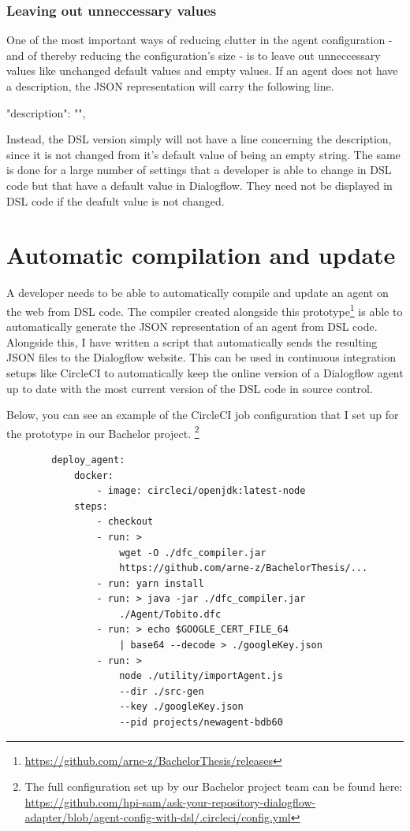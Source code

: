 \subsubsection{Leaving out unneccessary values}

One of the most important ways of reducing clutter in the agent configuration - and of thereby reducing the configuration's size - is to leave out unneccessary values like unchanged default values and empty values.
If an agent does not have a description, the JSON representation will carry the following line.
\begin{JSON}
    "description": "",
\end{JSON}
Instead, the DSL version simply will not have a line concerning the description, since it is not changed from it's default value of being an empty string.
The same is done for a large number of settings that a developer is able to change in DSL code but that have a default value in Dialogflow. They need not be displayed in DSL code if the deafult value is not changed.


\section{Automatic compilation and update}
A developer needs to be able to automatically compile and update an agent on the web from DSL code.
The compiler created alongside this prototype\footnote{\url{https://github.com/arne-z/BachelorThesis/releases}} is able to automatically generate the JSON representation of an agent from DSL code.
Alongside this, I have written a script that automatically sends the resulting JSON files to the Dialogflow website.
This can be used in continuous integration setups like CircleCI \cite{CircleCI} to automatically keep the online version of a Dialogflow agent up to date with the most current version of the DSL code in source control.

Below, you can see an example of the CircleCI job configuration that I set up for the prototype in our Bachelor project.
\footnote{The full configuration set up by our Bachelor project team can be found here:\\
\url{https://github.com/hpi-sam/ask-your-repository-dialogflow-adapter/blob/agent-config-with-dsl/.circleci/config.yml}}
\begin{samepage}    
    \begin{lstlisting}
        deploy_agent:
            docker:
                - image: circleci/openjdk:latest-node
            steps:
                - checkout
                - run: > 
                    wget -O ./dfc_compiler.jar
                    https://github.com/arne-z/BachelorThesis/...
                - run: yarn install
                - run: > java -jar ./dfc_compiler.jar 
                    ./Agent/Tobito.dfc
                - run: > echo $GOOGLE_CERT_FILE_64 
                    | base64 --decode > ./googleKey.json
                - run: >
                    node ./utility/importAgent.js 
                    --dir ./src-gen 
                    --key ./googleKey.json 
                    --pid projects/newagent-bdb60
    \end{lstlisting}
\end{samepage}

